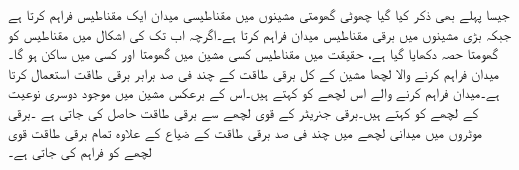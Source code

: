 جیسا پہلے بھی ذکر کیا گیا چھوٹی گھومتی مشینوں میں مقناطیسی میدان ایک مقناطیس  فراہم کرتا ہے جبکہ بڑی مشینوں میں برقی مقناطیس  میدان فراہم کرتا ہے۔اگرچہ اب تک کی اشکال میں مقناطیس کو گھومتا حصہ دکھایا گیا ہے، حقیقت میں مقناطیس  کسی مشین میں گھومتا اور کسی میں  ساکن ہو گا۔ میدان فراہم کرنے والا لچھا مشین کے کل برقی طاقت کے چند فی صد برابر برقی طاقت استعمال کرتا ہے۔میدان فراہم کرنے والے اس لچھے کو   کہتے ہیں۔اس کے برعکس مشین میں موجود دوسری نوعیت کے لچھے کو   کہتے ہیں۔برقی جنریٹر کے قوی لچھے سے  برقی طاقت  حاصل کی جاتی ہے ۔برقی موٹروں میں میدانی لچھے میں چند فی صد برقی طاقت کے ضیاع کے علاوہ  تمام برقی طاقت  قوی لچھے کو فراہم کی جاتی ہے۔
\begin{figure}
\centering
\begin{minipage}{0.45\textwidth}
\centering
\end{minipage}
\end{figure}
